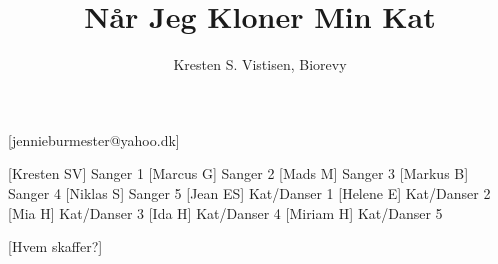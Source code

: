 \documentclass[a4paper,12pt]{article}
\title{Når Jeg Kloner Min Kat}
\author{Kresten S. Vistisen, Biorevy}
\begin{document}
\maketitle

\begin{texxers}
	[jennieburmester@yahoo.dk]
\end{texxers}

\begin{roles}
	[Kresten SV] Sanger 1
	[Marcus G] Sanger 2
	[Mads M] Sanger 3
	[Markus B] Sanger 4
	[Niklas S] Sanger 5
	[Jean ES] Kat/Danser 1
	[Helene E] Kat/Danser 2
	[Mia H] Kat/Danser 3
	[Ida H] Kat/Danser 4
	[Miriam H] Kat/Danser 5
\end{roles}


\begin{props}
	[Hvem skaffer?] 
\end{props}
\end{document}
